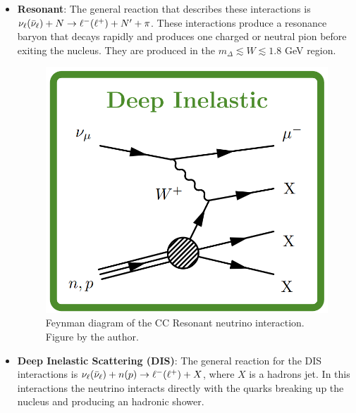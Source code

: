 \begin{itemize}
    \item \textbf{Resonant}: The general reaction that describes these interactions is $\nu_\ell(\Bar{\nu}_\ell) + N\rightarrow \ell^- (\ell^+) + N' + \pi$. These interactions produce a resonance baryon that decays rapidly and produces one charged or neutral pion before exiting the nucleus. They are produced in the $m_\Delta \lesssim W \lesssim 1.8$ GeV region.

    \begin{figure}[!htb]
        \centering
        \includegraphics[scale=0.25]{Figures/Chapter1/DISChannel.png}
        \caption{Feynman diagram of the CC Resonant neutrino interaction. Figure by the author.}
        \label{fig:Int:NuInteractions:CCRESFeynman}
    \end{figure}
    
    \item \textbf{Deep Inelastic Scattering (DIS)}: The general reaction for the DIS interactions is $\nu_\ell(\Bar{\nu}_\ell) + n(p)\rightarrow \ell^- (\ell^+) + X$, where $X$ is a hadrons jet. In this interactions the neutrino interacts directly with the quarks breaking up the nucleus and producing an hadronic shower.


\end{itemize}
